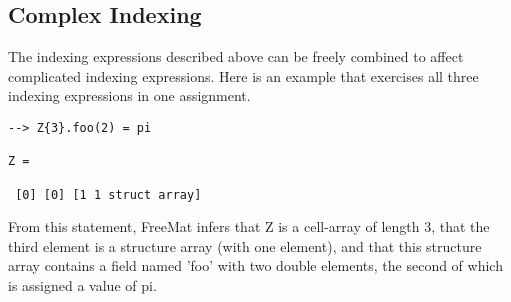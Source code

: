 \subsection{Complex Indexing}

The indexing expressions described above can be freely combined
to affect complicated indexing expressions.  Here is an example
that exercises all three indexing expressions in one assignment.
\begin{verbatim}
--> Z{3}.foo(2) = pi

Z = 

 [0] [0] [1 1 struct array] 
\end{verbatim}
From this statement, FreeMat infers that Z is a cell-array of 
length 3, that the third element is a structure array (with one
element), and that this structure array contains a field named
'foo' with two double elements, the second of which is assigned
a value of pi.
